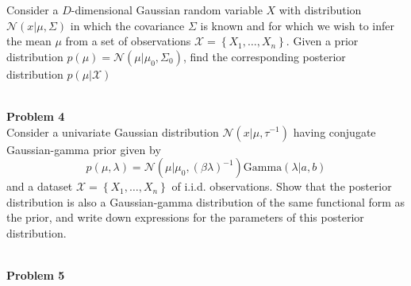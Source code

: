 \documentclass{article}
\begin{document}
Consider a $D$-dimensional Gaussian random variable $X$ with distribution $\mathcal{N}(x|\mu,\Sigma)$ in which the covariance $\Sigma$ is known and for which we wish to infer the mean $\mu$ from a set of observations $\mathcal{X} = \left\{X_1,\dots,X_n\right\}$. Given a prior distribution $p(\mu) =\mathcal{N}\left(\mu|\mu_0,\Sigma_0\right) $, find the corresponding posterior distribution $p(\mu|\mathcal{X})$

\leavevmode\\
\noindent
\Large{\textbf{Problem 4}}\normalsize
\\

Consider a univariate Gaussian distribution $\mathcal{N}(x|\mu, \tau^{-1})$ having conjugate Gaussian-gamma prior given by 
$$p(\mu,\lambda) = \mathcal{N}\left(\mu|\mu_0,(\beta\lambda)^{-1}\right)\text{Gamma}(\lambda|a,b)$$
and a dataset $\mathcal{X} = \left\{X_1,\dots,X_n\right\}$ of i.i.d. observations. Show that the posterior distribution is 
also a Gaussian-gamma distribution of the same functional form as the prior, and write down 
expressions for the parameters of this posterior distribution.

\leavevmode\\
\newpage
{}
\noindent
\Large{\textbf{Problem 5}}\normalsize
\\
\end{document}
